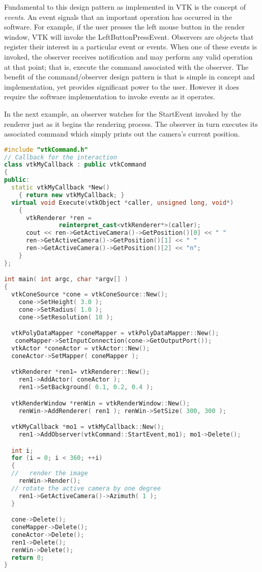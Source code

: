 Fundamental to this design pattern as implemented in VTK is the concept of \emph{events}. An event signals that an important operation has occurred in the software. For example, if the user presses the left mouse button in the render window, VTK will invoke the LeftButtonPressEvent. Observers are objects that register their interest in a particular event or events. When one of these events is invoked, the observer receives notification and may perform any valid operation at that point; that is, execute the command associated with the observer. The benefit of the command/observer design pattern is that is simple in concept and implementation, yet provides significant power to the user. However it does require the software implementation to invoke events as it operates.

In the next example, an observer watches for the StartEvent invoked by the renderer just as it begins the rendering process. The observer in turn executes its associated command which simply prints out the camera's current position.

\begin{lstlisting}[language=C++, caption={}]
#include "vtkCommand.h"
// Callback for the interaction
class vtkMyCallback : public vtkCommand
{
public:
  static vtkMyCallback *New()
    { return new vtkMyCallback; }
  virtual void Execute(vtkObject *caller, unsigned long, void*)
    {
      vtkRenderer *ren =
               reinterpret_cast<vtkRenderer*>(caller);
      cout << ren->GetActiveCamera()->GetPosition()[0] << " "
      ren->GetActiveCamera()->GetPosition()[1] << " "
      ren->GetActiveCamera()->GetPosition()[2] << "n";
    }
};

int main( int argc, char *argv[] )
{
  vtkConeSource *cone = vtkConeSource::New();
    cone->SetHeight( 3.0 );
    cone->SetRadius( 1.0 );
    cone->SetResolution( 10 );

  vtkPolyDataMapper *coneMapper = vtkPolyDataMapper::New();
   coneMapper->SetInputConnection(cone->GetOutputPort());
  vtkActor *coneActor = vtkActor::New();
  coneActor->SetMapper( coneMapper );

  vtkRenderer *ren1= vtkRenderer::New();
    ren1->AddActor( coneActor );
    ren1->SetBackground( 0.1, 0.2, 0.4 );

  vtkRenderWindow *renWin = vtkRenderWindow::New();
    renWin->AddRenderer( ren1 ); renWin->SetSize( 300, 300 );

  vtkMyCallback *mo1 = vtkMyCallback::New();
    ren1->AddObserver(vtkCommand::StartEvent,mo1); mo1->Delete();

  int i;
  for (i = 0; i < 360; ++i)
  {
  //   render the image
    renWin->Render();
  // rotate the active camera by one degree
    ren1->GetActiveCamera()->Azimuth( 1 );
  }

  cone->Delete();
  coneMapper->Delete();
  coneActor->Delete();
  ren1->Delete();
  renWin->Delete();
  return 0;
}
\end{lstlisting}

